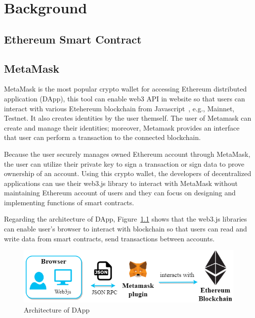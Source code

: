 \chapter{Background}
\label{chapter:background}

\section{Ethereum Smart Contract}

\newpage
\section{MetaMask}
MetaMask is the most popular crypto wallet for accessing Ethereum distributed application (DApp), this tool can enable web3 API in website so that users can interact with various Etehereum blockchain from Javascript~\cite{web3.js}, e.g., Mainnet, Testnet. It also creates identities by the user themself. The user of Metamask can create and manage their identities; moreover, Metamask provides an interface that user can perform a transaction to the connected blockchain.\par
Because the user securely manages owned Ethereum account through MetaMask, the user can utilize their private key to sign a transaction or sign data to prove ownership of an account. Using this crypto wallet, the developers of decentralized applications can use their web3.js library to interact with MetaMask without maintaining Ethereum account of users and they can focus on designing and implementing functions of smart contracts.\par
Regarding the architecture of DApp, Figure~\ref{fig:architecture_of_dapp} shows that the web3.js libraries can enable user's browser to interact with blockchain so that users can read and write data from smart contracts, send transactions between accounts. \par


\begin{figure}[hb]
    \centering
    \includegraphics[height=!,width=1\linewidth,keepaspectratio=true]{figures/architecture_of_dapp.png}
    \caption{{\footnotesize Architecture of DApp}}
    \label{fig:architecture_of_dapp}
\end{figure}

